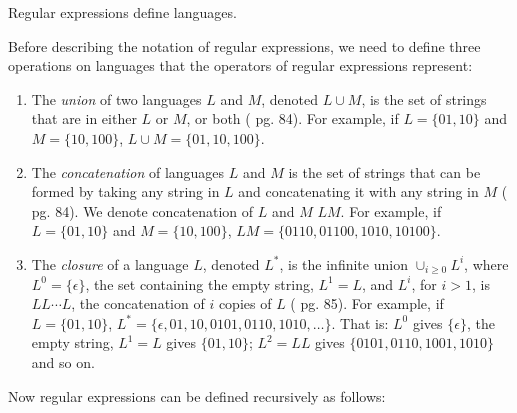 \documentclass[a4paper,oneside,11pt]{book}
\theoremstyle{definition}
\begin{document}
Regular expressions define languages.

Before describing the notation of regular expressions,
we need to define three operations on languages that the operators of regular expressions represent:

\begin{enumerate}

\item
The \emph{union} of two languages $L$ and $M$, denoted $L \cup M$, is the set of strings that are in
either $L$ or $M$, or both (\cite{AUTOMATA} pg. 84).
For example, if $L = \{01, 10\}$ and $M = \{10, 100\}$, $L \cup M = \{01, 10, 100\}$.

\item
The \emph{concatenation} of languages $L$ and $M$ is the set of strings that can be formed by taking
any string in $L$ and concatenating it with any string in $M$ (\cite{AUTOMATA} pg. 84).
We denote concatenation of $L$ and $M$ $LM$.
For example, if $L = \{01, 10\}$ and $M = \{10, 100\}$, $LM = \{0110, 01100, 1010, 10100\}$.

\item
The \emph{closure} of a language $L$, denoted $L^*$, is the infinite union $\cup _{i\ge0}L^i$,
where $L^0 = \{\epsilon\}$, the set containing the empty string, $L^1 = L$, and
$L^i$, for $i > 1$, is $LL \cdots L$, the concatenation of $i$ copies of $L$ (\cite{AUTOMATA} pg. 85).
For example, if $L = \{01, 10\}$, $L^* = \{\epsilon, 01, 10, 0101, 0110, 1010, \ldots\}$.
That is: $L^0$ gives $\{\epsilon\}$, the empty string, $L^1 = L$ gives $\{01, 10\}$;
$L^2 = LL$ gives $\{0101, 0110, 1001, 1010\}$ and so on.

\end{enumerate}

Now regular expressions can be defined recursively as follows:
\end{document}
